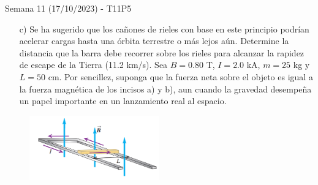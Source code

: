\begin{frame}{Semana 11 (17/10/2023) - T11P5}

\begin{itemize}
    \item[c)] Se ha sugerido que los cañones de rieles con base
en este principio podrían acelerar cargas hasta una órbita terrestre o
más lejos aún. Determine la distancia que la barra debe recorrer sobre
los rieles para alcanzar la rapidez de escape de la Tierra (11.2 km/s). Sea $B = 0.80$ T, $I = 2.0$ kA, $m = 25$ kg y $L = 50$ cm. Por sencillez,
suponga que la fuerza neta sobre el objeto es igual a la fuerza magnética de los incisos a) y b), aun cuando la gravedad desempeña un
papel importante en un lanzamiento real al espacio.
\end{itemize}

\begin{figure}
    \centering
    \includegraphics[width=0.5\textwidth]{figures/t10p2.png}
\end{figure}
    
\end{frame}

